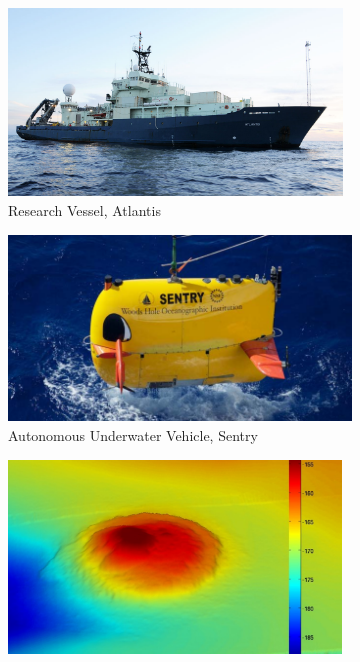 \documentclass[jair,twoside,11pt,theapa]{article}
\begin{document}
\begin{figure}[ht!]
   	\centering
    \begin{subfigure}[b]{0.45\textwidth}
	    \centering
        \includegraphics[width=0.975\textwidth]{figures/atlantis.pdf}
        \caption{Research Vessel, Atlantis}
        \label{fig:atlantis}
    \end{subfigure}
    \begin{subfigure}[b]{0.45\textwidth}
	    \centering
       \includegraphics[width=\textwidth]{figures/sentry.pdf}
       \caption{Autonomous Underwater Vehicle, Sentry}
       \label{fig:sentry}
    \end{subfigure}
	\begin{subfigure}[b]{0.45\textwidth}
		\centering
	     \includegraphics[width=0.97\textwidth]{figures/asphalt_domes.pdf}

\end{subfigure}
\end{figure}
\end{document}
